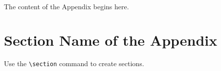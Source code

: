 \begin{appendices}
\oneappendix
{}
The content of the Appendix begins here.
\section{Section Name of the Appendix}
Use the \verb|\section| command to create sections.
\end{appendices}
